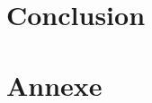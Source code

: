 \documentclass[a4paper]{article}
\begin{document}
\clearpage


\section{Conclusion}

\clearpage

\section{Annexe}
\end{document}
